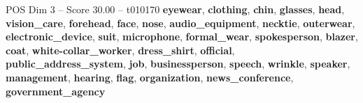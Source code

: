 \begin{textsample}{POS Dim 3 – Score 30.00 – t010170}  \label{ex:f3_pos_039}
\textbf{eyewear}, \textbf{clothing}, \textbf{chin}, \textbf{glasses}, \textbf{head}, \textbf{vision\_care}, \textbf{forehead}, \textbf{face}, \textbf{nose}, \textbf{audio\_equipment}, \textbf{necktie}, \textbf{outerwear}, \textbf{electronic\_device}, \textbf{suit}, \textbf{microphone}, \textbf{formal\_wear}, \textbf{spokesperson}, \textbf{blazer}, \textbf{coat}, \textbf{white-collar\_worker}, \textbf{dress\_shirt}, \textbf{official}, \textbf{public\_address\_system}, \textbf{job}, \textbf{businessperson}, \textbf{speech}, \textbf{wrinkle}, \textbf{speaker}, \textbf{management}, \textbf{hearing}, \textbf{flag}, \textbf{organization}, \textbf{news\_conference}, \textbf{government\_agency}

\end{textsample}
